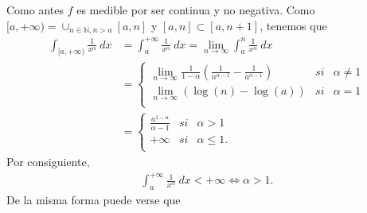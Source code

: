 \begin{ejemplo}
\begin{enumerate}
              Como antes $f$ es medible por ser continua y no negativa. Como $[a,+\infty) = \cup_{n \in \mathbb{N},n > a}{[a,n]}$ y $[a,n] \subset [a,n+1]$, tenemos que
              \begin{align*}
                  \int_{[a,+\infty)}{\frac{1}{x^{\alpha}} \ dx} & = \int_{a}^{+\infty}{\frac{1}{x^{\alpha}} \ dx} = \lim_{n \to \infty}{\int_{a}^{n}{\frac{1}{x^{\alpha}} \ dx}}                            \\
                                                                & = \left\{ \begin{array}{lcc}
                                                                                \lim_{n \to \infty}{\frac{1}{1-\alpha}\left( \frac{1}{n^{\alpha - 1}} - \frac{1}{a^{\alpha - 1}}\right)} & si & \alpha \not = 1 \\
                                                                                \lim_{n \to \infty}{(\log(n) - \log(a))}                                                                 & si & \alpha = 1      \\
                                                                            \end{array}
                  \right.                                                                                                                                                                                   \\
                                                                & = \left\{ \begin{array}{lcc}
                                                                                \frac{a^{1 - \alpha}}{\alpha - 1} & si & \alpha > 1     \\
                                                                                +\infty                           & si & \alpha \leq 1. \\
                                                                            \end{array}
                  \right.
              \end{align*}
              Por consiguiente,
              \begin{align*}
                  \int_{a}^{+\infty}{\frac{1}{x^{\alpha}} \ dx} < +\infty \Longleftrightarrow \alpha > 1.
              \end{align*}
              De la misma forma puede verse que
              \begin{align*}

\end{align*}
\end{enumerate}
\end{ejemplo}
